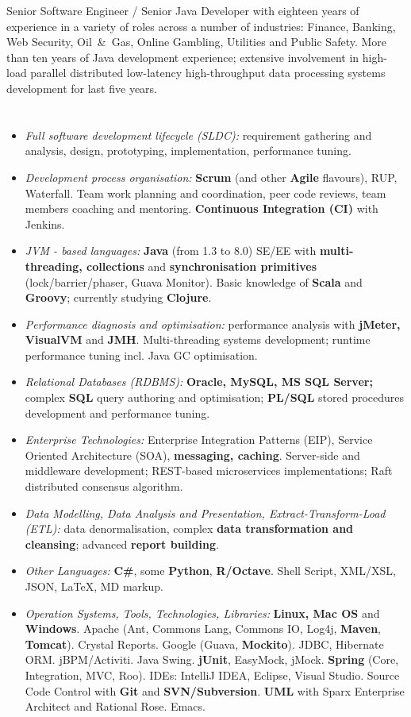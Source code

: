 \documentclass{res}
\newcommand{\emp}[1]{{\bf#1}}
\newcommand{\osection}[1]{\section{\sc {\Large \textbf{#1}\\}} \vspace{0.30cm}}
\newcommand{\profileItem}[2]{\item {\sl #1:} #2.}
\begin{document}
\begin{resume}

\indent Senior Software Engineer / Senior Java Developer with eighteen years of experience in a variety of roles across a number of industries: Finance, Banking, Web Security, Oil~\&~Gas, Online Gambling, Utilities and Public Safety. More than ten years of Java development experience; extensive involvement in high-load parallel distributed low-latency high-throughput data processing systems development for last five years.

\osection{Technical Profile}
\begin{itemize}
  \profileItem {Full software development lifecycle (SLDC)} {requirement gathering and analysis, design, prototyping, implementation, performance tuning}
  \profileItem {Development process organisation} {\emp{Scrum} (and other \emp{Agile} flavours), RUP, Waterfall. Team work planning and coordination, peer code reviews, team members coaching and mentoring. \emp{Continuous Integration (CI)} with Jenkins}
  \profileItem {JVM - based languages} {\emp{Java} (from 1.3 to 8.0) SE/EE with \emp{multi-threading, collections} and \emp{synchronisation primitives} (lock/barrier/phaser, Guava Monitor). Basic knowledge of \emp{Scala} and \emp{Groovy}; currently studying \emp{Clojure}}
  \profileItem{Performance diagnosis and optimisation} {performance analysis with \emp{jMeter, VisualVM} and \emp{JMH}. Multi-threading systems development; runtime performance tuning incl. Java GC optimisation}
  \profileItem {Relational Databases (RDBMS)} {\emp{Oracle, MySQL, MS SQL Server;} complex \emp{SQL} query authoring and optimisation; \emp{PL/SQL} stored procedures development and performance tuning}
  \profileItem{Enterprise Technologies} {Enterprise Integration Patterns (EIP), Service Oriented Architecture (SOA), \emp{messaging, caching}. Server-side and middleware development; REST-based microservices implementations; Raft distributed consensus algorithm}
  \profileItem{Data Modelling, Data Analysis and Presentation, Extract-Transform-Load (ETL)} {data denormalisation, complex \emp{data transformation and cleansing}; advanced \emp{report building}}
  \profileItem{Other Languages} {\emp{C\#}, some \emp{Python}, \emp{R/Octave}. Shell Script, XML/XSL, JSON, \LaTeX, MD markup}
  \profileItem{Operation Systems, Tools, Technologies, Libraries} {\emp{Linux, Mac OS} and \emp{Windows}. Apache (Ant, Commons Lang, Commons IO, Log4j, \emp{Maven}, \emp{Tomcat}). Crystal Reports. Google (Guava, \emp{Mockito}). JDBC, Hibernate ORM. jBPM/Activiti. Java Swing. \emp{jUnit}, EasyMock, jMock. \emp{Spring} (Core, Integration, MVC, Roo). IDEs: IntelliJ IDEA, Eclipse, Visual Studio. Source Code Control with \emp{Git} and \emp{SVN/Subversion}. \emp{UML} with Sparx Enterprise Architect and Rational Rose. Emacs}


\end{itemize}
\end{resume}
\end{document}
